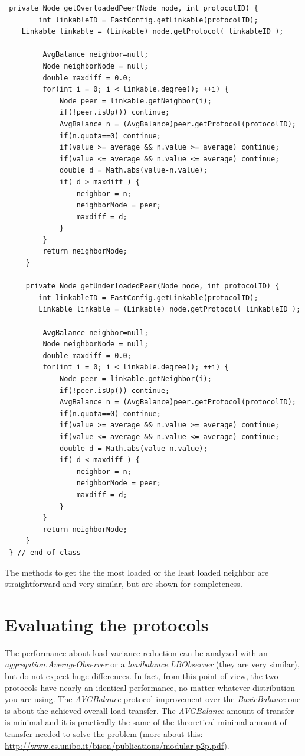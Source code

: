 \documentclass[a4paper,11pt]{article}
\begin{document}
\footnotesize
\begin{verbatim}
 private Node getOverloadedPeer(Node node, int protocolID) {
        int linkableID = FastConfig.getLinkable(protocolID);
	Linkable linkable = (Linkable) node.getProtocol( linkableID );
	
         AvgBalance neighbor=null;
         Node neighborNode = null;
         double maxdiff = 0.0;
         for(int i = 0; i < linkable.degree(); ++i) {
             Node peer = linkable.getNeighbor(i); 
             if(!peer.isUp()) continue;
             AvgBalance n = (AvgBalance)peer.getProtocol(protocolID);
             if(n.quota==0) continue;
             if(value >= average && n.value >= average) continue;
             if(value <= average && n.value <= average) continue;
             double d = Math.abs(value-n.value); 
             if( d > maxdiff ) {
                 neighbor = n;
                 neighborNode = peer;
                 maxdiff = d;
             }
         }
         return neighborNode;
     } 
 
     private Node getUnderloadedPeer(Node node, int protocolID) {
        int linkableID = FastConfig.getLinkable(protocolID);
        Linkable linkable = (Linkable) node.getProtocol( linkableID );
     
         AvgBalance neighbor=null;
         Node neighborNode = null;
         double maxdiff = 0.0;
         for(int i = 0; i < linkable.degree(); ++i) {
             Node peer = linkable.getNeighbor(i);
             if(!peer.isUp()) continue;
             AvgBalance n = (AvgBalance)peer.getProtocol(protocolID);
             if(n.quota==0) continue;
             if(value >= average && n.value >= average) continue;
             if(value <= average && n.value <= average) continue;
             double d = Math.abs(value-n.value); 
             if( d < maxdiff ) {
                 neighbor = n;
                 neighborNode = peer;
                 maxdiff = d;
             }
         }
         return neighborNode;
     } 
 } // end of class
\end{verbatim}
\normalsize

The methods to get the the most loaded or the least loaded neighbor
are straightforward and very similar, but are shown for completeness.


\section{Evaluating the protocols}

The performance about load variance reduction can be analyzed with
an \emph{aggregation.AverageObserver} or a \emph{loadbalance.LBObserver}
(they are very similar), but do not expect huge differences. In fact,
from this point of view, the two protocols have nearly an identical
performance, no matter whatever distribution you are using. The 
\emph{AVGBalance}
protocol improvement over the \emph{BasicBalance} one is about the
achieved overall load transfer. The \emph{AVGBalance} amount of transfer
is minimal and it is practically the same of the theoretical minimal
amount of transfer needed to solve the problem 
(more about this: \url{http://www.cs.unibo.it/bison/publications/modular-p2p.pdf}). 
\end{document}
